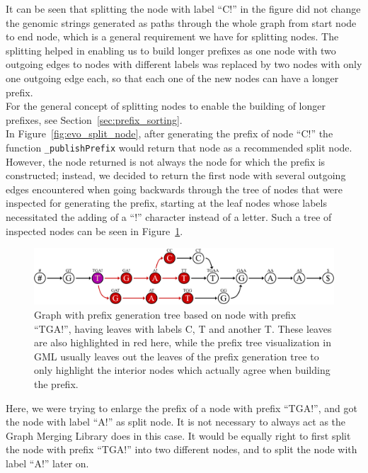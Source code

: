 \documentclass[a4paper,12pt,twoside,BCOR=10mm]{scrbook}
\begin{document}
It can be seen that splitting the node with label “C!” in the figure did not change the
genomic strings generated as paths through the whole graph from start node to end node,
which is a general requirement we have for splitting nodes.
The splitting helped in enabling us to build longer prefixes as one node with
two outgoing edges to nodes with different labels was replaced by two nodes
with only one outgoing edge each, so that each one of the new nodes can
have a longer prefix. \\
For the general concept of splitting nodes to
enable the building of longer prefixes, see Section~\ref{sec:prefix_sorting}. \\
In Figure~\ref{fig:evo_split_node},
after generating the prefix of node “C!” the function \texttt{\_publishPrefix} would
return that node as a recommended split node. However, the node returned is
not always the node for which the prefix is constructed; instead, we decided to return the first node
with several outgoing edges encountered when going backwards through the tree of nodes
that were inspected for generating the prefix, starting at the leaf nodes whose labels
necessitated the adding of a “!” character instead of a letter.
Such a tree of inspected nodes can be seen in Figure~\ref{fig:evo_node_splitting_tree}.
\begin{figure}[!htb]
\centering
\includegraphics[width=\textwidth]{evo_node_splitting_tree.pdf}
\caption[Graph with prefix generation tree]{Graph with prefix generation tree based on node with prefix \textup{“TGA!”}, having leaves with labels \textup{C, T} and another \textup{T}. These leaves are also highlighted in red here, while the prefix tree visualization in GML usually leaves out the leaves of the prefix generation tree to only highlight the interior nodes which actually agree when building the prefix.} \label{fig:evo_node_splitting_tree}
\end{figure}
Here, we were trying to enlarge the prefix of a node with prefix “TGA!”,
and got the node with label “A!” as split node.
It is not necessary to always act as the Graph Merging Library does in this case.
It would be equally right to first split the node with prefix “TGA!” into two different nodes,
and to split the node with label “A!” later on.
\end{document}
